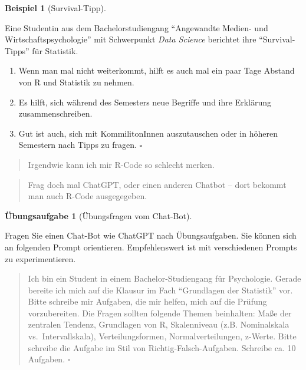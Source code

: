 \documentclass[
  letterpaper,
  twoside,
  open=any]{scrbook}
\providecommand{\tightlist}{%
  \setlength{\itemsep}{0pt}\setlength{\parskip}{0pt}}\usepackage{longtable,booktabs,array}
\theoremstyle{definition}
\theoremstyle{definition}
\newtheorem{exercise}{Übungsaufgabe}[chapter]
\theoremstyle{definition}
\newtheorem{example}{Beispiel}[chapter]
\theoremstyle{remark}
\begin{document}
\begin{example}[Survival-Tipp]\protect\hypertarget{exm-survival1}{}\label{exm-survival1}

Eine Studentin aus dem Bachelorstudiengang \enquote{Angewandte Medien-
und Wirtschaftspsychologie} mit Schwerpunkt \emph{Data Science}
berichtet ihre \enquote{Survival-Tipps} für Statistik.

\begin{enumerate}
\def\labelenumi{\arabic{enumi}.}
\tightlist
\item
  Wenn man mal nicht weiterkommt, hilft es auch mal ein paar Tage
  Abstand von R und Statistik zu nehmen.
\item
  Es hilft, sich während des Semesters neue Begriffe und ihre Erklärung
  zusammenschreiben.
\item
  Gut ist auch, sich mit KommilitonInnen auszutauschen oder in höheren
  Semestern nach Tipps zu fragen. \(\square\)
\end{enumerate}

\end{example}

\begin{quote}
{} Irgendwie kann ich mir R-Code so schlecht merken.
\end{quote}

\begin{quote}
{} Frag doch mal ChatGPT, oder einen anderen Chatbot --
dort bekommt man auch R-Code ausgegegeben.
\end{quote}

\begin{exercise}[Übungsfragen vom
Chat-Bot]\protect\hypertarget{exr-chatgpt}{}\label{exr-chatgpt}

Fragen Sie einen Chat-Bot wie ChatGPT nach Übungsaufgaben. Sie können
sich an folgenden Prompt orientieren. Empfehlenswert ist mit
verschiedenen Prompts zu experimentieren.

\begin{quote}
{} Ich bin ein Student in einem Bachelor-Studiengang für
Psychologie. Gerade bereite ich mich auf die Klausur im Fach
\enquote{Grundlagen der Statistik} vor. Bitte schreibe mir Aufgaben, die
mir helfen, mich auf die Prüfung vorzubereiten. Die Fragen sollten
folgende Themen beinhalten: Maße der zentralen Tendenz, Grundlagen von
R, Skalenniveau (z.B. Nominalskala vs.~Intervallskala),
Verteilungsformen, Normalverteilungen, z-Werte. Bitte schreibe die
Aufgabe im Stil von Richtig-Falsch-Aufgaben. Schreibe ca. 10 Aufgaben.
\(\square\)
\end{quote}

\end{exercise}
\end{document}
